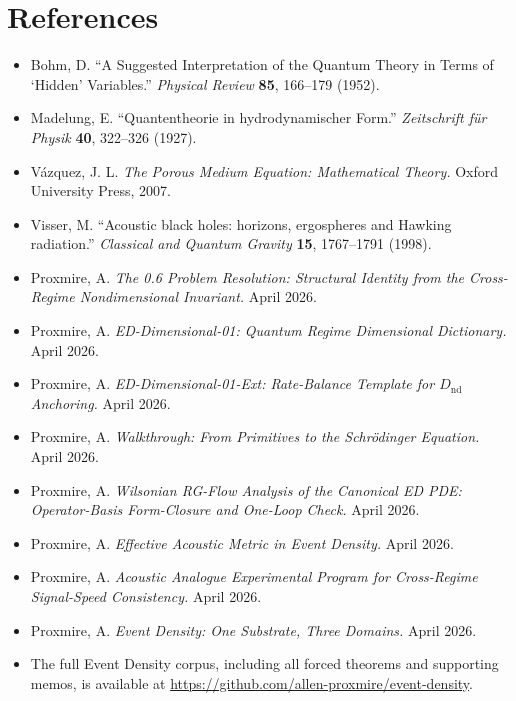 \documentclass[11pt,a4paper]{article}
\begin{document}
\section{References}

\begin{itemize}[noitemsep]
\item Bohm, D. ``A Suggested Interpretation of the Quantum Theory in Terms of `Hidden' Variables.'' \textit{Physical Review} \textbf{85}, 166--179 (1952).
\item Madelung, E. ``Quantentheorie in hydrodynamischer Form.'' \textit{Zeitschrift f\"ur Physik} \textbf{40}, 322--326 (1927).
\item V\'azquez, J. L. \textit{The Porous Medium Equation: Mathematical Theory.} Oxford University Press, 2007.
\item Visser, M. ``Acoustic black holes: horizons, ergospheres and Hawking radiation.'' \textit{Classical and Quantum Gravity} \textbf{15}, 1767--1791 (1998).
\item Proxmire, A. \textit{The 0.6 Problem Resolution: Structural Identity from the Cross-Regime Nondimensional Invariant.} April 2026.
\item Proxmire, A. \textit{ED-Dimensional-01: Quantum Regime Dimensional Dictionary.} April 2026.
\item Proxmire, A. \textit{ED-Dimensional-01-Ext: Rate-Balance Template for $D_\mathrm{nd}$ Anchoring.} April 2026.
\item Proxmire, A. \textit{Walkthrough: From Primitives to the Schr\"odinger Equation.} April 2026.
\item Proxmire, A. \textit{Wilsonian RG-Flow Analysis of the Canonical ED PDE: Operator-Basis Form-Closure and One-Loop Check.} April 2026.
\item Proxmire, A. \textit{Effective Acoustic Metric in Event Density.} April 2026.
\item Proxmire, A. \textit{Acoustic Analogue Experimental Program for Cross-Regime Signal-Speed Consistency.} April 2026.
\item Proxmire, A. \textit{Event Density: One Substrate, Three Domains.} April 2026.
\item The full Event Density corpus, including all forced theorems and supporting memos, is available at \url{https://github.com/allen-proxmire/event-density}.
\end{itemize}
\end{document}

